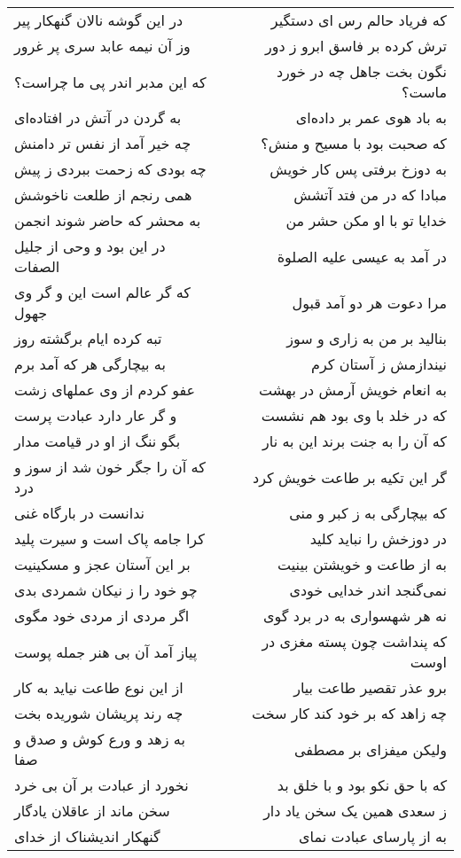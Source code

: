\begin{center}
\begin{longtable}{l p{0.5cm} r}
در این گوشه نالان گنهکار پیر
&&
که فریاد حالم رس ای دستگیر
\\
وز آن نیمه عابد سری پر غرور
&&
ترش کرده بر فاسق ابرو ز دور
\\
که این مدبر اندر پی ما چراست؟
&&
نگون بخت جاهل چه در خورد ماست؟
\\
به گردن در آتش در افتاده‌ای
&&
به باد هوی عمر بر داده‌ای
\\
چه خیر آمد از نفس تر دامنش
&&
که صحبت بود با مسیح و منش؟
\\
چه بودی که زحمت ببردی ز پیش
&&
به دوزخ برفتی پس کار خویش
\\
همی رنجم از طلعت ناخوشش
&&
مبادا که در من فتد آتشش
\\
به محشر که حاضر شوند انجمن
&&
خدایا تو با او مکن حشر من
\\
در این بود و وحی از جلیل الصفات
&&
در آمد به عیسی علیه الصلوة
\\
که گر عالم است این و گر وی جهول
&&
مرا دعوت هر دو آمد قبول
\\
تبه کرده ایام برگشته روز
&&
بنالید بر من به زاری و سوز
\\
به بیچارگی هر که آمد برم
&&
نیندازمش ز آستان کرم
\\
عفو کردم از وی عملهای زشت
&&
به انعام خویش آرمش در بهشت
\\
و گر عار دارد عبادت پرست
&&
که در خلد با وی بود هم نشست
\\
بگو ننگ از او در قیامت مدار
&&
که آن را به جنت برند این به نار
\\
که آن را جگر خون شد از سوز و درد
&&
گر این تکیه بر طاعت خویش کرد
\\
ندانست در بارگاه غنی
&&
که بیچارگی به ز کبر و منی
\\
کرا جامه پاک است و سیرت پلید
&&
در دوزخش را نباید کلید
\\
بر این آستان عجز و مسکینیت
&&
به از طاعت و خویشتن بینیت
\\
چو خود را ز نیکان شمردی بدی
&&
نمی‌گنجد اندر خدایی خودی
\\
اگر مردی از مردی خود مگوی
&&
نه هر شهسواری به در برد گوی
\\
پیاز آمد آن بی هنر جمله پوست
&&
که پنداشت چون پسته مغزی در اوست
\\
از این نوع طاعت نیاید به کار
&&
برو عذر تقصیر طاعت بیار
\\
چه رند پریشان شوریده بخت
&&
چه زاهد که بر خود کند کار سخت
\\
به زهد و ورع کوش و صدق و صفا
&&
ولیکن میفزای بر مصطفی
\\
نخورد از عبادت بر آن بی خرد
&&
که با حق نکو بود و با خلق بد
\\
سخن ماند از عاقلان یادگار
&&
ز سعدی همین یک سخن یاد دار
\\
گنهکار اندیشناک از خدای
&&
به از پارسای عبادت نمای
\\
\end{longtable}
\end{center}
